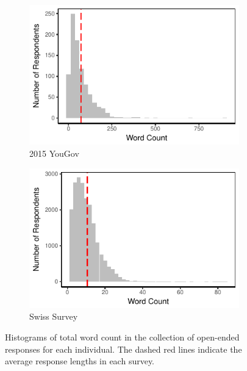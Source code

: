 \begin{figure}[h]
    \begin{subfigure}[t]{0.49\textwidth}
        \centering
        \includegraphics{../fig/yg_wc.pdf}
        \caption{2015 YouGov}
    \end{subfigure}
    \begin{subfigure}[t]{0.49\textwidth}
         \centering
         \includegraphics{../fig/swiss_wc.pdf}
         \caption{Swiss Survey}
    \end{subfigure}
    \caption{Histograms of total word count in the collection of open-ended responses for each individual. The dashed red lines indicate the average response lengths in each survey.}\label{fig:wc}
\end{figure}

